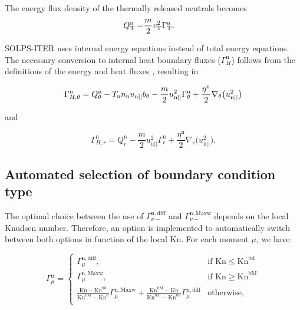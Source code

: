 \noindent The energy flux density of the thermally released neutrals becomes
\begin{align}\label{eq:Qnboundary_efc}
Q_{\mathrm{T}}^{\mathrm{n}} =& \frac{m}{2} v_{\mathrm{T}}^{2} \Gamma_{\mathrm{T}}^{\mathrm{n}}.
\end{align}

\noindent SOLPS-ITER uses internal energy equations instead of total energy equations. The necessary conversion to internal heat boundary fluxes ($\Gamma_{H}^{\mathrm{n}}$) follows from the definitions of the energy and heat fluxes \cite{b25_benchmark}, resulting in

\begin{equation}
    \Gamma_{H,\theta}^{\mathrm{n}} = Q^{\mathrm{n}}_\theta - T_\mathrm{n} n_{\mathrm{n}} u_{\mathrm{n}||} b_\theta - \frac{m}{2} u_{\mathrm{n}||}^2  \Gamma^\mathrm{n}_{\theta} + \frac{\eta^\mathrm{n}}{2} \nabla_\theta \big( u_{\mathrm{n}||}^2 \big)
\end{equation}

and

\begin{equation}
        \Gamma_{H,r}^{\mathrm{n}} = Q^{\mathrm{n}}_r  - \frac{m}{2} u_{\mathrm{n}||}^2 \Gamma^\mathrm{n}_{r} + \frac{\eta^\mathrm{n}}{2} \nabla_r \big( u_{\mathrm{n}||}^2 \big).
\end{equation}

\subsection{Automated selection of boundary condition type} \label{sec:auto_selection}

The optimal choice between the use of $\Gamma_{\nu-}^{\mathrm{n,diff}}$ and $\Gamma_{\nu-}^{\mathrm{n,Maxw}}$ depends on the local Knudsen number. Therefore, an option is implemented to automatically switch between both options in function of the local Kn. For each moment $\mu$, we have:

\begin{equation}\label{eq:maxw_vs_diff}
    \Gamma_{\mu}^\mathrm{n}=
\begin{cases}
    \Gamma_{\mu}^{\mathrm{n,diff}} ,&
 \text{if } \mathrm{Kn} \leq \mathrm{Kn}^{\mathrm{bd}}\\
    \Gamma_{\mu}^{\mathrm{n,Maxw}},  & \text{if } \mathrm{Kn} \geq \mathrm{Kn}^{\mathrm{bM}} \\
    \frac{\mathrm{Kn}-\mathrm{Kn}^{\mathrm{bd}}}{\mathrm{Kn}^{\mathrm{bM}}-\mathrm{Kn}^{\mathrm{d}}}\Gamma_{\mu}^{\mathrm{n,Maxw}} + \frac{\mathrm{Kn}^{\mathrm{bM}}-\mathrm{Kn}}{\mathrm{Kn}^{\mathrm{bM}}-\mathrm{Kn}^{\mathrm{bd}}}\Gamma_{\mu}^{\mathrm{n,diff}}  & \text{otherwise,} \\
\end{cases}
\end{equation}

